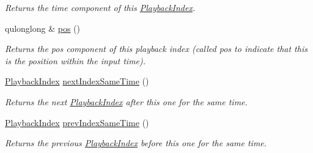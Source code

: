\begin{DoxyCompactItemize}
\begin{DoxyCompactList}\small\item\em Returns the time component of this \hyperlink{struct_picto_1_1_playback_index}{Playback\-Index}. \end{DoxyCompactList}\item 
qulonglong \& \hyperlink{struct_picto_1_1_playback_index_a1a046d21d2744bbb5e35431307819e02}{pos} ()
\begin{DoxyCompactList}\small\item\em Returns the pos component of this playback index (called pos to indicate that this is the position within the input time). \end{DoxyCompactList}\item 
\hypertarget{struct_picto_1_1_playback_index_a4dd007f475c7a32c39797caddab3d4c9}{\hyperlink{struct_picto_1_1_playback_index}{Playback\-Index} \hyperlink{struct_picto_1_1_playback_index_a4dd007f475c7a32c39797caddab3d4c9}{next\-Index\-Same\-Time} ()}\label{struct_picto_1_1_playback_index_a4dd007f475c7a32c39797caddab3d4c9}

\begin{DoxyCompactList}\small\item\em Returns the next \hyperlink{struct_picto_1_1_playback_index}{Playback\-Index} after this one for the same time. \end{DoxyCompactList}\item 
\hypertarget{struct_picto_1_1_playback_index_a0d1657002a6a2b64d62089825cbe7430}{\hyperlink{struct_picto_1_1_playback_index}{Playback\-Index} \hyperlink{struct_picto_1_1_playback_index_a0d1657002a6a2b64d62089825cbe7430}{prev\-Index\-Same\-Time} ()}\label{struct_picto_1_1_playback_index_a0d1657002a6a2b64d62089825cbe7430}

\begin{DoxyCompactList}\small\item\em Returns the previous \hyperlink{struct_picto_1_1_playback_index}{Playback\-Index} before this one for the same time. \end{DoxyCompactList}\end{DoxyCompactItemize}
